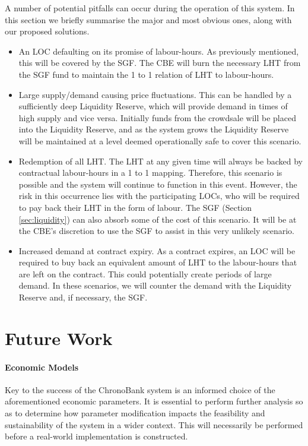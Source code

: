 \begin{multicols}{2}
A number of potential pitfalls can occur during the operation of this system. In this section we briefly summarise the major and most obvious ones, along with our proposed solutions. 
\begin{itemize}
  \setlength\itemsep{2mm}
  \item An LOC defaulting on its promise of labour-hours. As previously mentioned, this will be covered by the SGF. The CBE will burn the necessary LHT from the SGF fund to maintain the 1 to 1 relation of LHT to labour-hours.
  \item Large supply/demand causing price fluctuations. This can be handled by a sufficiently deep Liquidity Reserve, which will provide demand in times of high supply and vice versa.   Initially funds from the crowdsale will be placed into the Liquidity Reserve, and as the system grows the Liquidity Reserve will be maintained at a level deemed operationally safe to cover this scenario. 
  \item Redemption of all LHT. The LHT at any given time will always be backed by contractual labour-hours in a 1 to 1 mapping. Therefore, this scenario is possible and the system will continue to function in this event. However, the risk in this occurrence lies with the participating LOCs, who will be required to pay back their LHT in the form of labour. The SGF (Section \ref{sec:liquidity}) can also absorb some of the cost of this scenario.  It will be at the CBE's discretion to use the SGF to assist in this very unlikely scenario.  
  \item Increased demand at contract expiry. As a contract expires, an LOC will be required to buy back an equivalent amount of LHT to the labour-hours that are left on the contract. This could potentially create periods of large demand. In these scenarios, we will counter the demand with the Liquidity Reserve and, if necessary, the SGF. 
\end{itemize}


\section{Future Work}
\label{sec:future-work}

\paragraph{Economic Models}
Key to the success of the ChronoBank system is an informed choice of the aforementioned economic parameters. It is essential to perform further analysis so as to determine how parameter modification impacts the feasibility and sustainability of the system in a wider context. This will necessarily be performed before a real-world implementation is constructed. 


\end{multicols}
